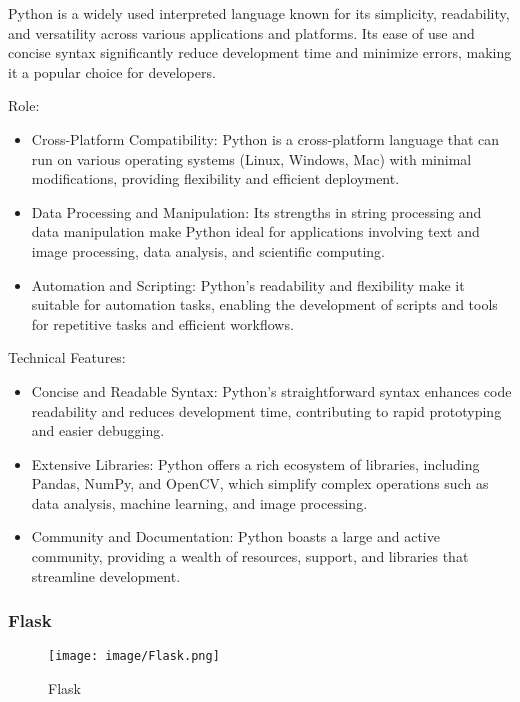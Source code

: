 \documentclass[conference]{IEEEtran}
\begin{document}
\noindent Python is a widely used interpreted language known for its simplicity, readability, and versatility across various applications and platforms. Its ease of use and concise syntax significantly reduce development time and minimize errors, making it a popular choice for developers.

Role:
\begin{itemize}
    \item Cross-Platform Compatibility: Python is a cross-platform language that can run on various operating systems (Linux, Windows, Mac) with minimal modifications, providing flexibility and efficient deployment.\\
    \item Data Processing and Manipulation: Its strengths in string processing and data manipulation make Python ideal for applications involving text and image processing, data analysis, and scientific computing.\\
    \item Automation and Scripting: Python's readability and flexibility make it suitable for automation tasks, enabling the development of scripts and tools for repetitive tasks and efficient workflows.\\
\end{itemize}

Technical Features:
\begin{itemize}
    \item Concise and Readable Syntax: Python’s straightforward syntax enhances code readability and reduces development time, contributing to rapid prototyping and easier debugging.\\
    \item Extensive Libraries: Python offers a rich ecosystem of libraries, including Pandas, NumPy, and OpenCV, which simplify complex operations such as data analysis, machine learning, and image processing.\\
    \item Community and Documentation: Python boasts a large and active community, providing a wealth of resources, support, and libraries that streamline development.\\
\end{itemize}

\subsubsection{Flask}
\begin{figure}[h!]
    \centering
    \texttt{[image: image/Flask.png]}
    \caption{Flask}
    \label{fig:enter-label}
\end{figure}
\end{document}
